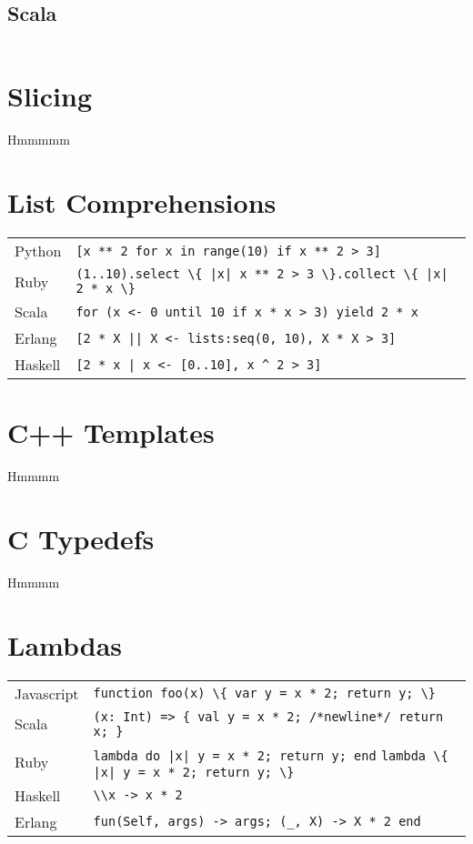 \documentclass{article}
\begin{document}
\subsection{Scala}
\begin{lstlisting}

\end{lstlisting}

\section{Slicing}
Hmmmmm

\section{List Comprehensions}
\begin{longtabu} to 0.75\linewidth { X X }
	Python & \lstinline$[x ** 2 for x in range(10) if x ** 2 > 3]$ \\
	Ruby & \lstinline$(1..10).select \{ |x| x ** 2 > 3 \}.collect \{ |x| 2 * x \}$ \\
	Scala & \lstinline$for (x <- 0 until 10 if x * x > 3) yield 2 * x$ \\
	Erlang & \lstinline$[2 * X || X <- lists:seq(0, 10), X * X > 3]$ \\
	Haskell & \lstinline$[2 * x | x <- [0..10], x ^ 2 > 3]$ \\
\end{longtabu}

\section{C++ Templates}
Hmmmm

\section{C Typedefs}
Hmmmm

\section{Lambdas}
\begin{longtabu} to 0.75\linewidth { X X }
	Javascript & \lstinline$function foo(x) \{ var y = x * 2; return y; \}$ \\
	Scala & \lstinline$(x: Int) => { val y = x * 2; /*newline*/ return x; }$ \\
	Ruby & \lstinline$lambda do |x| y = x * 2; return y; end$ \newline \lstinline$lambda \{ |x| y = x * 2; return y; \}$ \\
	Haskell & \lstinline$\\x -> x * 2$ \\
	Erlang & \lstinline$fun(Self, args) -> args; (_, X) -> X * 2 end$ \\
\end{longtabu}
\end{document}
